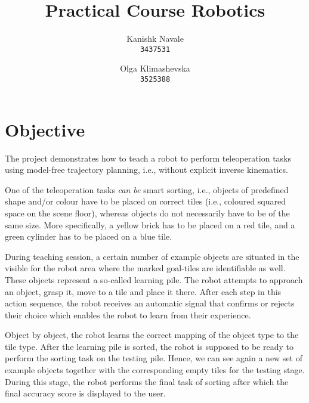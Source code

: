 \documentclass[a4paper,11pt,twoside]{article}
\begin{document}

\author{
    Kanishk Navale\\
    \texttt{3437531}
    \and
    Olga Klimashevska\\
    \texttt{3525388}
}

\title{Practical Course Robotics}


\maketitle


\section{Objective} \label{Sec:Obj}
The project demonstrates how to teach a robot to perform teleoperation tasks using model-free trajectory planning, i.e., without explicit inverse kinematics.

One of the teleoperation tasks \textit{can be} smart sorting, i.e., objects of predefined shape and/or colour have to be placed on correct tiles (i.e., coloured squared space on the scene floor), whereas objects do not necessarily have to be of the same size. More specifically, a yellow brick has to be placed on a red tile, and a green cylinder has to be placed on a blue tile.

During  teaching session, a certain number of example objects are situated in the visible for the robot area where the marked goal-tiles are identifiable as well. These objects represent a so-called learning pile. The robot attempts to approach an object, grasp it, move to a tile and place it there. After each step in this action sequence, the robot receives an automatic signal that confirms or rejects their choice which enables the robot to learn from their experience.

Object by object, the robot learns the correct mapping of the object type to the tile type. After the learning pile is sorted, the robot is supposed to be ready to perform the sorting task on the testing pile. Hence, we can see again a new set of example objects together with the corresponding empty tiles for the testing stage. During this stage, the robot performs the final task of sorting after which the final accuracy score is displayed to the user.
\end{document}
